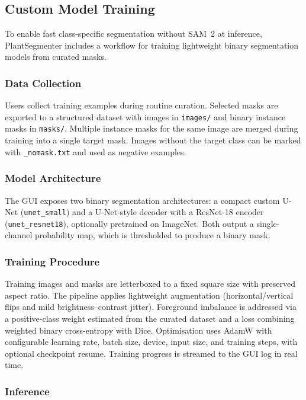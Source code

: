 \documentclass[12pt, a4paper]{article}
\begin{document}
\subsection{Custom Model Training}
\label{sec:training}

To enable fast class-specific segmentation without SAM~2 at inference, PlantSegmenter includes a workflow for training lightweight binary segmentation models from curated masks.

\subsubsection{Data Collection}

Users collect training examples during routine curation. Selected masks are exported to a structured dataset with images in \texttt{images/} and binary instance masks in \texttt{masks/}. Multiple instance masks for the same image are merged during training into a single target mask. Images without the target class can be marked with \texttt{\_nomask.txt} and used as negative examples.

\subsubsection{Model Architecture}

The GUI exposes two binary segmentation architectures: a compact custom U-Net (\texttt{unet\_small}) and a U-Net-style decoder with a ResNet-18 encoder (\texttt{unet\_resnet18}), optionally pretrained on ImageNet. Both output a single-channel probability map, which is thresholded to produce a binary mask.

\subsubsection{Training Procedure}

Training images and masks are letterboxed to a fixed square size with preserved aspect ratio. The pipeline applies lightweight augmentation (horizontal/vertical flips and mild brightness–contrast jitter). Foreground imbalance is addressed via a positive-class weight estimated from the curated dataset and a loss combining weighted binary cross-entropy with Dice. Optimisation uses AdamW with configurable learning rate, batch size, device, input size, and training steps, with optional checkpoint resume. Training progress is streamed to the GUI log in real time.

\subsubsection{Inference}
\end{document}
